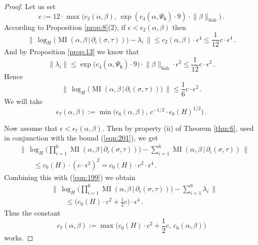 \documentclass[10pt, a4paper]{amsart}
\theoremstyle{definition}
\numberwithin{equation}{section}
\newcommand{\opn}{\operatorname}
\newcommand{\mfrak}[1]{\mathfrak{#1}}
\newcommand{\mrm}[1]{\mathrm{#1}}
\newcommand{\smfrac}[2]{{\textstyle \frac{#1}{#2}}}
\newcommand{\bosum}{\sum\nolimits}
\newcommand{\boprod}{\prod\nolimits}
\newcommand{\norm}[1]{\lVert #1 \rVert}
\newcommand{\Norm}[1]{\bigl\lVert\, #1 \, \bigr\rVert}
\renewcommand{\vert}{\, | \,}
\newcommand{\h}{\mfrak{h}}
\begin{document}
\begin{proof}
Let us set
\[ c := 12 \cdot \max \bigl( c_2(\alpha, \beta), \, 
\exp ( c_4(\alpha, \Psi_{\h}) \cdot 9 ) \cdot 
\norm{\beta}_{\mrm{Sob}} \bigr) \, . \]
According to Proposition \ref{prop:8}(2), if
$\epsilon < \epsilon_2(\alpha, \beta)$ then 
\begin{equation} \label{eqn:199}
\Norm{ \log_H \bigl( \opn{MI}(\alpha, \beta \vert \partial_i(\sigma, \tau)) 
\bigr) - \lambda_i } 
\leq c_2(\alpha, \beta) \cdot \epsilon^4 
\leq \smfrac{1}{12} c \cdot \epsilon^4 \, . 
\end{equation}
And by Proposition \ref{prop:13} we know that
\begin{equation*} \label{eqn:200}
\norm{\lambda_i} \leq \exp \bigl( c_4(\alpha, \Psi_{\h}) \cdot 9 \bigr) \cdot 
\norm{\beta}_{\mrm{Sob}} \cdot \epsilon^2 
\leq \smfrac{1}{12} c \cdot \epsilon^2 \, .  
\end{equation*}
Hence
\begin{equation} \label{eqn:201}
\Norm{ \log_H \bigl( 
\opn{MI}(\alpha, \beta \vert \partial_i(\sigma, \tau)) \bigr) }
\leq \smfrac{1}{6}  c \cdot  \epsilon^2 \, .  
\end{equation}
We will take 
\[ \epsilon_7(\alpha, \beta) := \min \bigl( 
\epsilon_6(\alpha, \beta), \, 
c^{- 1/2} \cdot \epsilon_0(H)^{1/2} \bigr) \, . \]

Now assume that
$\epsilon <  \epsilon_7(\alpha, \beta)$. Then by property (ii) of Theorem
\ref{thm:6}, used in conjunction with the bound (\ref{eqn:201}), we get
\[ \begin{aligned}
& \Norm{ \log_H \bigl( \boprod_{i = 1}^6  
\opn{MI}(\alpha, \beta \vert \partial_i(\sigma, \tau)) \bigr)
- \bosum_{i = 1}^6  
\opn{MI}(\alpha, \beta \vert \partial_i(\sigma, \tau)) } \\
& \qquad \leq 
c_0(H) \cdot (c \cdot \epsilon^2)^2 = 
c_0(H) \cdot c^2 \cdot \epsilon^4 \, . 
\end{aligned} \]
Combining this with (\ref{eqn:199}) we obtain 
\begin{equation} \label{eqn:202}
\begin{aligned}
& \Norm{ \log_H \bigl( \boprod_{i = 1}^6  
\opn{MI}(\alpha, \beta \vert \partial_i(\sigma, \tau)) \bigr)
- \bosum_{i = 1}^6 \lambda_i } \\
& \qquad \leq 
\bigl( c_0(H) \cdot c^2 + \smfrac{1}{2} c \bigr) \cdot \epsilon^4 \, . 
\end{aligned} 
\end{equation}
Thus the constant
\[ c_7(\alpha, \beta) := \max \bigl( 
c_0(H) \cdot c^2 + \smfrac{1}{2} c, \, c_6(\alpha, \beta) \bigr)  \]
works.
\end{proof}
\end{document}
